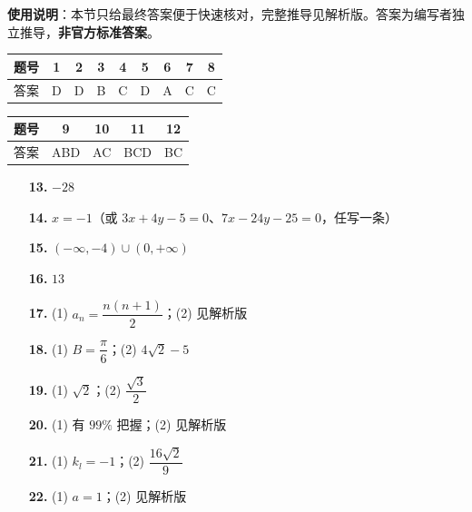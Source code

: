 
\begin{gknotice}
\textbf{使用说明}：本节只给最终答案便于快速核对，完整推导见解析版。答案为编写者独立推导，\textbf{非官方标准答案}。
\end{gknotice}

\begin{center}\begin{tabular}{ccccccccc}
\toprule
题号 & 1 & 2 & 3 & 4 & 5 & 6 & 7 & 8 \\
\midrule
答案 & D & D & B & C & D & A & C & C \\
\bottomrule
\end{tabular}\end{center}

\begin{center}\begin{tabular}{ccccc}
\toprule
题号 & 9 & 10 & 11 & 12 \\
\midrule
答案 & ABD & AC & BCD & BC \\
\bottomrule
\end{tabular}\end{center}

\begin{itemize}[leftmargin=2.6em]
  \item[\textbf{13.}] $-28$
  \item[\textbf{14.}] $x=-1$（或 $3x+4y-5=0$、$7x-24y-25=0$，任写一条）
  \item[\textbf{15.}] $(-\infty,-4)\cup(0,+\infty)$
  \item[\textbf{16.}] $13$
\end{itemize}

\begin{itemize}[leftmargin=2.6em]
  \item[\textbf{17.}] (1) $a_n=\dfrac{n(n+1)}2$；(2) 见解析版
  \item[\textbf{18.}] (1) $B=\dfrac\pi6$；(2) $4\sqrt2-5$
  \item[\textbf{19.}] (1) $\sqrt2$；(2) $\dfrac{\sqrt3}2$
  \item[\textbf{20.}] (1) 有 $99\%$ 把握；(2) 见解析版
  \item[\textbf{21.}] (1) $k_l=-1$；(2) $\dfrac{16\sqrt2}9$
  \item[\textbf{22.}] (1) $a=1$；(2) 见解析版
\end{itemize}
